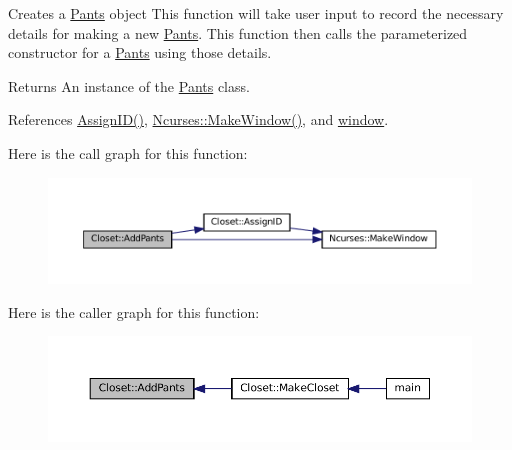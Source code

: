 Creates a \textquotesingle{}\mbox{\hyperlink{classPants}{Pants}}\textquotesingle{} object  This function will take user input to record the necessary details for making a new \textquotesingle{}\mbox{\hyperlink{classPants}{Pants}}\textquotesingle{}. This function then calls the parameterized constructor for a \textquotesingle{}\mbox{\hyperlink{classPants}{Pants}}\textquotesingle{} using those details. 

\begin{DoxyReturn}{Returns}
An instance of the \textquotesingle{}\mbox{\hyperlink{classPants}{Pants}}\textquotesingle{} class. 
\end{DoxyReturn}


References \mbox{\hyperlink{classCloset_afabc27d621abdf0089a6b3027ea8f470}{Assign\+I\+D()}}, \mbox{\hyperlink{classNcurses_a1d8def11419a444c5696b5043da680d4}{Ncurses\+::\+Make\+Window()}}, and \mbox{\hyperlink{classCloset_af1eb4f786cc4eccd3018b90632236a93}{window}}.

Here is the call graph for this function\+:\nopagebreak
\begin{figure}[H]
\begin{center}
\leavevmode
\includegraphics[width=350pt]{classCloset_a86001d9aab63ec5cca05bb2daa67e755_cgraph}
\end{center}
\end{figure}
Here is the caller graph for this function\+:\nopagebreak
\begin{figure}[H]
\begin{center}
\leavevmode
\includegraphics[width=350pt]{classCloset_a86001d9aab63ec5cca05bb2daa67e755_icgraph}
\end{center}
\end{figure}
\mbox{\label{classCloset_aba3296cf8964b43f64911cc69c56cbfd}} 
